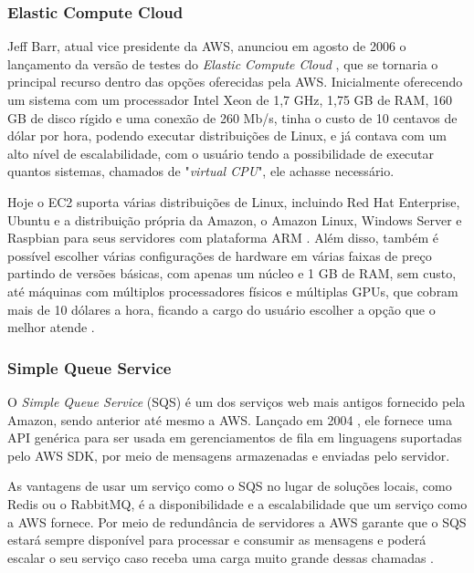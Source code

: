 \subsubsection{Elastic Compute Cloud}

\indent
\par Jeff Barr, atual vice presidente da AWS, anunciou em agosto de 2006 o lançamento da versão de testes do \textit{Elastic Compute Cloud} \cite{AWSEC2Beta}, que se tornaria o principal recurso dentro das opções oferecidas pela AWS. Inicialmente oferecendo um sistema com um processador Intel Xeon de 1,7 GHz, 1,75 GB de RAM, 160 GB de disco rígido e uma conexão de 260 Mb/s, tinha o custo de 10 centavos de dólar por hora, podendo executar distribuições de Linux, e já contava com um alto nível de escalabilidade, com o usuário tendo a possibilidade de executar quantos sistemas, chamados de "\textit{virtual CPU}", ele achasse necessário.
\indent
\par Hoje o EC2 suporta várias distribuições de Linux, incluindo Red Hat Enterprise, Ubuntu e a distribuição própria da Amazon, o Amazon Linux, Windows Server e Raspbian para seus servidores com plataforma ARM \cite{awsSuppSystems}. Além disso, também é possível escolher várias configurações de hardware em várias faixas de preço partindo de versões básicas, com apenas um núcleo e 1 GB de RAM, sem custo, até máquinas com múltiplos processadores físicos e múltiplas GPUs, que cobram mais de 10 dólares a hora, ficando a cargo do usuário escolher a opção que o melhor atende \cite{AWSINSTANCE}.

\subsubsection{Simple Queue Service}

\indent
\par O \textit{Simple Queue Service} (SQS) é um dos serviços web mais antigos fornecido pela Amazon, sendo anterior até mesmo a AWS. Lançado em 2004 \cite{JeffBarr}, ele fornece uma API genérica para ser usada em gerenciamentos de fila em linguagens suportadas pelo AWS SDK, por meio de mensagens armazenadas e enviadas pelo servidor.
\indent
\par As vantagens de usar um serviço como o SQS no lugar de soluções locais, como Redis ou o RabbitMQ, é a disponibilidade e a escalabilidade que um serviço como a AWS fornece. Por meio de redundância de servidores a AWS garante que o SQS estará sempre disponível para processar e consumir as mensagens e poderá escalar o seu serviço caso receba uma carga muito grande dessas chamadas \cite{AWSSQS}.

